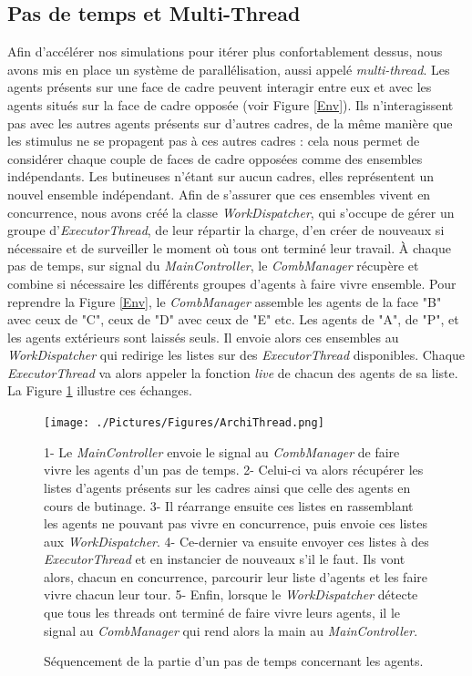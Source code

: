 			\subsection{Pas de temps et Multi-Thread}
			Afin d'accélérer nos simulations pour itérer plus confortablement dessus, nous avons mis en place un système de parallélisation, aussi appelé \textit{multi-thread}. Les agents présents sur une face de cadre peuvent interagir entre eux et avec les agents situés sur la face de cadre opposée (voir Figure \ref{Env}). Ils n'interagissent pas avec les autres agents présents sur d'autres cadres, de la même manière que les stimulus ne se propagent pas à ces autres cadres : cela nous permet de considérer chaque couple de faces de cadre opposées comme des ensembles indépendants. Les butineuses n'étant sur aucun cadres, elles représentent un nouvel ensemble indépendant. Afin de s'assurer que ces ensembles vivent en concurrence, nous avons créé la classe \textit{WorkDispatcher}, qui s'occupe de gérer un groupe d'\textit{ExecutorThread}, de leur répartir la charge, d'en créer de nouveaux si nécessaire et de surveiller le moment où tous ont terminé leur travail. À chaque pas de temps, sur signal du \textit{MainController}, le \textit{CombManager} récupère et combine si nécessaire les différents groupes d'agents à faire vivre ensemble. Pour reprendre la Figure \ref{Env}, le \textit{CombManager} assemble les agents de la face "B" avec ceux de "C", ceux de "D" avec ceux de "E" etc. Les agents de "A", de "P", et les agents extérieurs sont laissés seuls. Il envoie alors ces ensembles au \textit{WorkDispatcher} qui redirige les listes sur des \textit{ExecutorThread} disponibles. Chaque \textit{ExecutorThread} va alors appeler la fonction \textit{live} de chacun des agents de sa liste. La Figure \ref{ArchiThread} illustre ces échanges.
			
			\begin{figure}
			\centering
			\texttt{[image: ./Pictures/Figures/ArchiThread.png]}
			\caption{Séquencement de la partie d'un pas de temps concernant les agents.}{1- Le \textit{MainController} envoie le signal au \textit{CombManager} de faire vivre les agents d'un pas de temps. 2- Celui-ci va alors récupérer les listes d'agents présents sur les cadres ainsi que celle des agents en cours de butinage. 3- Il réarrange ensuite ces listes en rassemblant les agents ne pouvant pas vivre en concurrence, puis envoie ces listes aux \textit{WorkDispatcher}. 4- Ce-dernier va ensuite envoyer ces listes à des \textit{ExecutorThread} et en instancier de nouveaux s'il le faut. Ils vont alors, chacun en concurrence, parcourir leur liste d'agents et les faire vivre chacun leur tour. 5- Enfin, lorsque le \textit{WorkDispatcher} détecte que tous les threads ont terminé de faire vivre leurs agents, il le signal au \textit{CombManager} qui rend alors la main au \textit{MainController}.}
			\label{ArchiThread}
			\end{figure}
			
